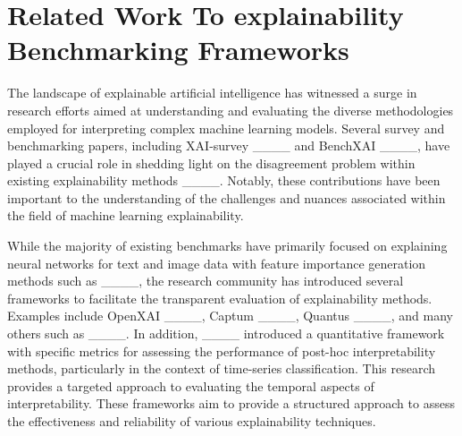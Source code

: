 \section{Related Work To explainability Benchmarking Frameworks}


The landscape of explainable artificial intelligence has witnessed a surge in research efforts aimed at understanding and evaluating the diverse methodologies employed for interpreting complex machine learning models. Several survey and benchmarking papers, including XAI-survey ____ and BenchXAI ____, have played a crucial role in shedding light on the disagreement problem within existing explainability methods ____. Notably, these contributions have been important to the understanding of the challenges and nuances associated within the field of machine learning explainability.

While the majority of existing benchmarks have primarily focused on explaining neural networks for text and image data with feature importance generation methods such as ____, %
the research community has introduced several frameworks to facilitate the transparent evaluation of explainability methods. Examples include OpenXAI ____, Captum ____, Quantus ____, and many others such as ____.
In addition, ____ introduced a quantitative framework with specific metrics for assessing the performance of post-hoc interpretability methods, particularly in the context of time-series classification. This research provides a targeted approach to evaluating the temporal aspects of interpretability.
These frameworks aim to provide a structured approach to assess the effectiveness and reliability of various explainability techniques. 

